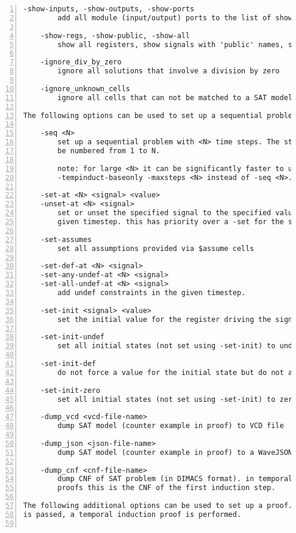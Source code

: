 \begin{lstlisting}[numbers=left,frame=single]
    -show-inputs, -show-outputs, -show-ports
        add all module (input/output) ports to the list of shown signals

    -show-regs, -show-public, -show-all
        show all registers, show signals with 'public' names, show all signals

    -ignore_div_by_zero
        ignore all solutions that involve a division by zero

    -ignore_unknown_cells
        ignore all cells that can not be matched to a SAT model

The following options can be used to set up a sequential problem:

    -seq <N>
        set up a sequential problem with <N> time steps. The steps will
        be numbered from 1 to N.

        note: for large <N> it can be significantly faster to use
        -tempinduct-baseonly -maxsteps <N> instead of -seq <N>.

    -set-at <N> <signal> <value>
    -unset-at <N> <signal>
        set or unset the specified signal to the specified value in the
        given timestep. this has priority over a -set for the same signal.

    -set-assumes
        set all assumptions provided via $assume cells

    -set-def-at <N> <signal>
    -set-any-undef-at <N> <signal>
    -set-all-undef-at <N> <signal>
        add undef constraints in the given timestep.

    -set-init <signal> <value>
        set the initial value for the register driving the signal to the value

    -set-init-undef
        set all initial states (not set using -set-init) to undef

    -set-init-def
        do not force a value for the initial state but do not allow undef

    -set-init-zero
        set all initial states (not set using -set-init) to zero

    -dump_vcd <vcd-file-name>
        dump SAT model (counter example in proof) to VCD file

    -dump_json <json-file-name>
        dump SAT model (counter example in proof) to a WaveJSON file.

    -dump_cnf <cnf-file-name>
        dump CNF of SAT problem (in DIMACS format). in temporal induction
        proofs this is the CNF of the first induction step.

The following additional options can be used to set up a proof. If also -seq
is passed, a temporal induction proof is performed.


\end{lstlisting}
